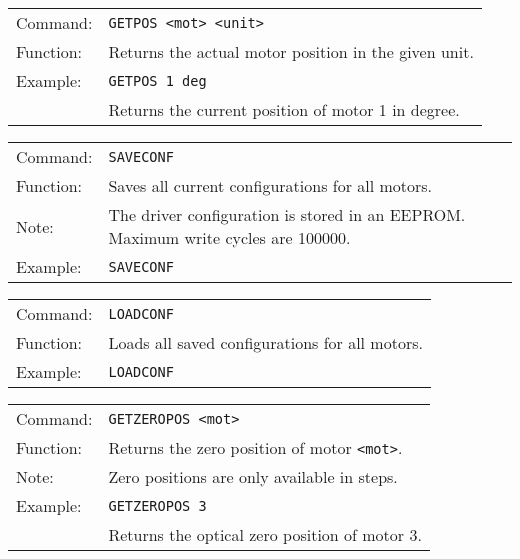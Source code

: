 \vspace{\vdistace}

\begin{table}[h]
  \begin{tabularx}{\textwidth}{lX}
    Command:  & \texttt{GETPOS <mot> <unit>}\\
    Function: & Returns the actual motor position in the given unit.\\
    Example:  & \texttt{GETPOS 1 deg} \\
              & Returns the current position of motor 1 in degree.
  \end{tabularx}
\end{table}

\vspace{\vdistace}

\begin{table}[h]
  \begin{tabularx}{\textwidth}{lX}
    Command:  & \texttt{SAVECONF}\\
    Function: & Saves all current configurations for all motors.\\
    Note:     & The driver configuration is stored in an EEPROM.
		            Maximum write cycles are 100000.\\
    Example:  & \texttt{SAVECONF}
  \end{tabularx}
\end{table}

\vspace{\vdistace}

\begin{table}[h]
  \begin{tabularx}{\textwidth}{lX}
    Command:  & \texttt{LOADCONF}\\
    Function: & Loads all saved configurations for all motors.\\
    Example:  & \texttt{LOADCONF}
  \end{tabularx}
\end{table}

\vspace{\vdistace}

\begin{table}[h]
  \begin{tabularx}{\textwidth}{lX}
    Command:  & \texttt{GETZEROPOS <mot>}\\
    Function: & Returns the zero position of motor \texttt{<mot>}.\\
    Note:     & Zero positions are only available in steps.\\
    Example:  & \texttt{GETZEROPOS 3}\\
              & Returns the optical zero position of motor 3.
  \end{tabularx}
\end{table}

